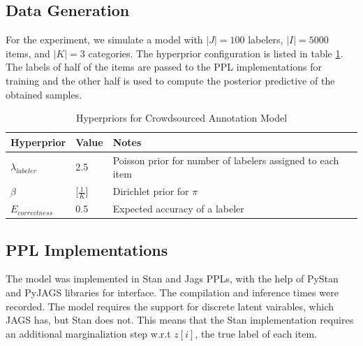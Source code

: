 \documentclass[../main.tex]{subfiles}
\begin{document}
\subsection{Data Generation}
For the experiment, we simulate a model with $|J| = 100$ labelers, $|I| = 5000$ items, and $|K| = 3$ categories. The hyperprior configuration is listed in table \ref{tab:table_CSA}.
The labels of half of the items are passed to the PPL implementations for training and the other half is used to compute the posterior predictive of the obtained samples.
\begin{table}[h]
 \caption{Hyperpriors for Crowdsourced Annotation Model}
  \centering
  \begin{tabular}{lll}              \\
    \cmidrule(r){1-3}
    Hyperprior             & Value            & Notes  \\
    \midrule
    $\lambda_{labeler}$    & 2.5              & Poisson prior for number of labelers assigned to each item    \\
    $\beta$                & [$\frac{1}{K}$]  & Dirichlet prior for $\pi$ \\
    $E_{correctness}$        & 0.5              & Expected accuracy of a labeler    \\
    \bottomrule
  \end{tabular}
  \label{tab:table_CSA}
\end{table}
\subsection{PPL Implementations}
The model was implemented in Stan and Jags PPLs, with the help of PyStan\cite{PyStan} and PyJAGS\cite{PyJAGS} libraries for interface.
The compilation and inference times were recorded.
The model requires the support for discrete latent vairables, which JAGS has, but Stan does not.
This means that the Stan implementation requires an additional marginaliztion step w.r.t $z[i]$, the true label of each item.
\end{document}
